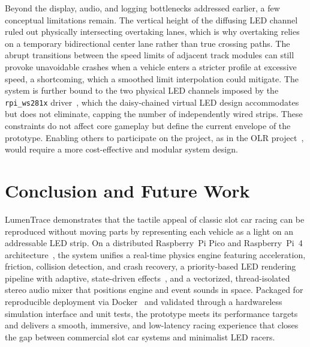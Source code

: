 \documentclass[10pt,journal,final,a4paper]{IEEEtran}
\begin{document}
Beyond the display, audio, and logging bottlenecks addressed earlier, a few conceptual limitations remain. 
The vertical height of the diffusing LED channel ruled out physically intersecting overtaking lanes, which is why overtaking relies on a temporary bidirectional center lane rather than true crossing paths. 
The abrupt transitions between the speed limits of adjacent track modules can still provoke unavoidable crashes when a vehicle enters a stricter profile at excessive speed, a shortcoming, which a smoothed limit interpolation could mitigate. 
The system is further bound to the two physical LED channels imposed by the \texttt{rpi\_ws281x} driver~\cite{garff:2023rpi}, which the daisy-chained virtual LED design accommodates but does not eliminate, capping the number of independently wired strips.
These constraints do not affect core gameplay but define the current envelope of the prototype.
Enabling others to participate on the project, as in the OLR project~\cite{openledrace:2025project}, would require a more cost-effective and modular system design.


\section{Conclusion and Future Work}
\label{sec:conclusion-and-future-work}

LumenTrace demonstrates that the tactile appeal of classic slot car racing can be reproduced without moving parts by representing each vehicle as a light on an addressable LED strip. On a distributed Raspberry~Pi Pico and Raspberry~Pi~4 architecture~\cite{magpi:2024raspberry}, the system unifies a real-time physics engine featuring acceleration, friction, collision detection, and crash recovery, a priority-based LED rendering pipeline with adaptive, state-driven effects~\cite{meschtscherjakov:2015chaselight}, and a vectorized, thread-isolated stereo audio mixer that positions engine and event sounds in space. Packaged for reproducible deployment via Docker~\cite{merkel:2014docker} and validated through a hardwareless simulation interface and unit tests, the prototype meets its performance targets and delivers a smooth, immersive, and low-latency racing experience that closes the gap between commercial slot car systems and minimalist LED racers.
\end{document}

